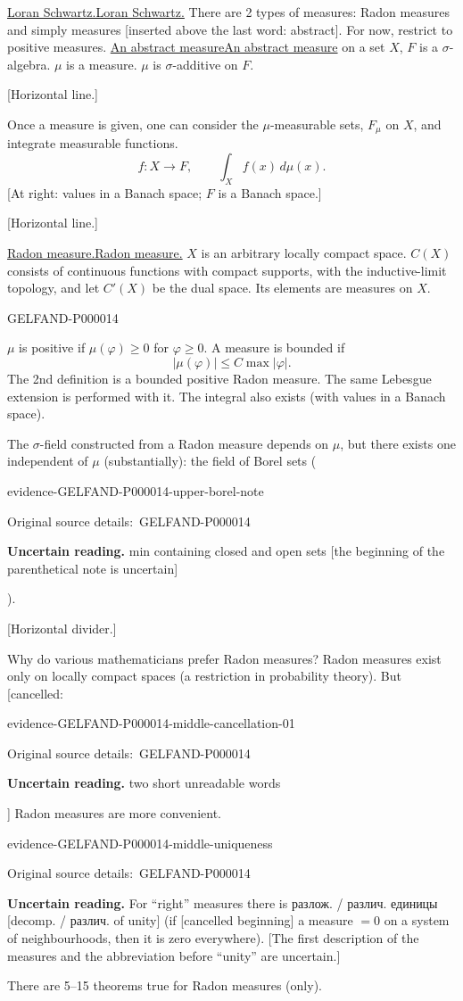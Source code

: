 \documentclass[11pt]{article}
\let\MathUnderline\underline
\renewcommand{\underline}[1]{\ifmmode\MathUnderline{#1}\else\uline{#1}\fi}
\newcommand{\SourcePage}[2]{\par\smallskip\phantomsection\label{#1:source-page}{\small\sffamily\color{blue!55!black}#1}\par\smallskip}
\newcommand{\EvidenceBlock}[4]{%
 \par\smallskip\noindent\begin{minipage}{\linewidth}
 \begin{minipage}[t]{.47\linewidth}\vspace{0pt}\centering
 \csname evidence-#1-#2\endcsname\par
 {\scriptsize\SourceCropCaption\ #1}\par
 \end{minipage}\hfill
 \begin{minipage}[t]{.49\linewidth}\vspace{0pt}\raggedright
 {\small\color{orange!65!black}\textbf{#4} #3}\par
 \end{minipage}
 \end{minipage}\par\smallskip}
\newcommand{\Unclear}[3]{\EvidenceBlock{#1}{#2}{#3}{\ReadingCaption}}
\newcommand{\SourceCropCaption}{Original source details:}\newcommand{\ReadingCaption}{Uncertain reading.}\newcommand{\IncompleteCaption}{Undeciphered passage.}\newcommand{\DiagramCaption}{Diagram and typed description.}
\begin{document}
\underline{Loran Schwartz.}
There are 2 types of measures: Radon measures and simply measures [inserted above the last word: abstract].
For now, restrict to positive measures.
\underline{An abstract measure} on a set $X$, $F$ is a $\sigma$-algebra.
$\mu$ is a measure. $\mu$ is $\sigma$-additive on $F$.

[Horizontal line.]

Once a measure is given, one can consider the $\mu$-measurable sets, $F_\mu$ on $X$, and integrate measurable functions.
\begin{equation*}
f:X\longrightarrow F,\qquad \int_Xf(x)\,d\mu(x).
\end{equation*}
[At right: values in a Banach space; $F$ is a Banach space.]

[Horizontal line.]

\underline{Radon measure.} $X$ is an arbitrary locally compact space.
$C(X)$ consists of continuous functions with compact supports, with the inductive-limit topology,
and let $C'(X)$ be the dual space.
Its elements are measures on $X$.


\SourcePage{GELFAND-P000014}{unlabelled}
$\mu$ is positive if $\mu(\varphi)\geq0$ for $\varphi\geq0$.
A measure is bounded if
\begin{equation*}
|\mu(\varphi)|\leq C\max|\varphi|.
\end{equation*}
The 2nd definition is a bounded positive Radon measure.
The same Lebesgue extension is performed with it.
The integral also exists (with values in a Banach space).

The $\sigma$-field constructed from a Radon measure depends on $\mu$, but there exists one independent of $\mu$ (substantially): the field of Borel sets
(\Unclear{GELFAND-P000014}{upper-borel-note}{min containing closed and open sets [the beginning of the parenthetical note is uncertain]}).

[Horizontal divider.]

Why do various mathematicians prefer Radon measures?
Radon measures exist only on locally compact spaces (a restriction in probability theory).
But [cancelled: \Unclear{GELFAND-P000014}{middle-cancellation-01}{two short unreadable words}] Radon measures are more convenient.
\Unclear{GELFAND-P000014}{middle-uniqueness}{For “right” measures there is разлож. / различ. единицы [decomp. / различ. of unity] (if [cancelled beginning] a measure $=0$ on a system of neighbourhoods, then it is zero everywhere). [The first description of the measures and the abbreviation before “unity” are uncertain.]}
There are 5--15 theorems true for Radon measures (only).
\end{document}
